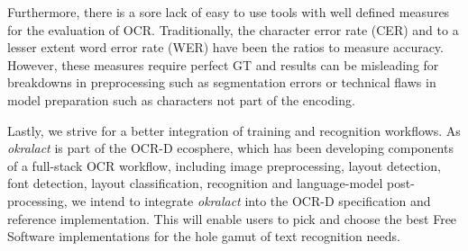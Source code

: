 \documentclass[conference]{IEEEtran}
\begin{document}

Furthermore, there is a sore lack of easy to use tools with well
defined measures for the evaluation of OCR. Traditionally, the
character error rate (CER) and to a lesser extent word error rate
(WER) have been the ratios to measure accuracy. However, these
measures require perfect GT and results can be misleading for
breakdowns in preprocessing such as segmentation errors or
technical flaws in model preparation such as characters not part
of the encoding.




Lastly, we strive for a better integration of training and
recognition workflows. As \textit{okralact} is part of the OCR-D
ecosphere, which has been developing components of a full-stack
OCR workflow, including image preprocessing, layout detection, font
detection, layout classification, recognition and language-model
post-processing, we intend to integrate \textit{okralact} into the
OCR-D specification and reference implementation. This will enable
users to pick and choose the best Free Software implementations for
the hole gamut of text recognition needs.



\end{document}
